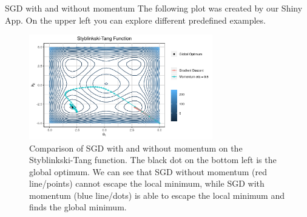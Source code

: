 \begin{vbframe}{SGD with and without momentum}
\footnotesize The following plot was created by our Shiny App. On the upper left you can explore different predefined examples. \href{https://juliambr.shinyapps.io/shinyapp/}{}
\begin{figure}
\vspace{-0.3cm}
  \captionsetup{font=footnotesize,labelfont=footnotesize, labelfont = bf}
  \centering
    \includegraphics[width = 8cm]{figure/momentum2.png}
    \caption{Comparison of SGD with and without momentum on the Styblinkski-Tang function.
    The black dot on the bottom left is the global optimum. We can see that 
    SGD without momentum (red line/points) cannot escape the local minimum, while SGD with momentum (blue line/dots) is able to escape the local minimum and finds the global minimum.}
  \end{figure}
\end{vbframe}

